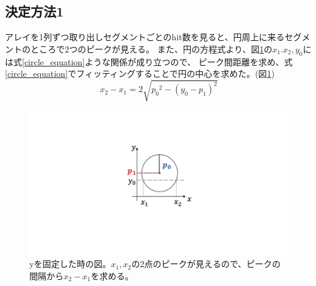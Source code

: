 \documentclass[uplatex, titlepage, dvipdfmx, 12pt, a4paper]{jsreport}
\begin{document}
    \subsection{決定方法1}
      アレイを1列ずつ取り出しセグメントごとのhit数を見ると、円周上に来るセグメントのところで2つのピークが見える。
      また、円の方程式より、図\ref{fig:find_center_image}の$x_1. x_2, y_0$には式\ref{circle_equation}ような関係が成り立つので、
      ピーク間距離を求め、式\ref{circle_equation}でフィッティングすることで円の中心を求めた。(図\ref{fig:find_center_image})
      \begin{equation}
        x_2 - x_1 = 2\sqrt{{p_0}^2-{\left(y_0-p_1\right)}^2}
        \label{circle_equation}
      \end{equation}
      \begin{figure}[hbtp]
        \begin{center}
          \includegraphics[scale=1, clip]{image/find_center1.pdf}
          \caption{yを固定した時の図。$x_1, x_2$の2点のピークが見えるので、ピークの間隔から$x_2-x_1$を求める。} 
          \label{fig:find_center_image} 
        \end{center}
      \end{figure}
\end{document}
